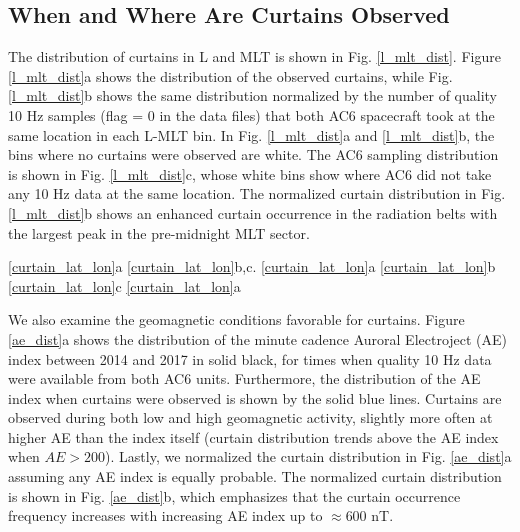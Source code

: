 \documentclass[draft]{agujournal2019}
\begin{document}
\subsection{When and Where Are Curtains Observed}
The distribution of curtains in L and MLT is shown in Fig. \ref{l_mlt_dist}. Figure \ref{l_mlt_dist}a shows the distribution of the observed curtains, while Fig. \ref{l_mlt_dist}b shows the same distribution normalized by the number of quality 10 Hz samples (flag = 0 in the data files) that both AC6 spacecraft took at the same location in each L-MLT bin. In Fig. \ref{l_mlt_dist}a and \ref{l_mlt_dist}b, the bins where no curtains were observed are white. The AC6 sampling distribution is shown in Fig. \ref{l_mlt_dist}c, whose white bins show where AC6 did not take any 10 Hz data at the same location. The normalized curtain distribution in Fig. \ref{l_mlt_dist}b shows an enhanced curtain occurrence in the radiation belts  with the largest peak in the pre-midnight MLT sector. 

 \ref{curtain_lat_lon}a  \ref{curtain_lat_lon}b,c.  \ref{curtain_lat_lon}a  \ref{curtain_lat_lon}b  \ref{curtain_lat_lon}c  \ref{curtain_lat_lon}a 

We also examine the geomagnetic conditions favorable for curtains. Figure \ref{ae_dist}a shows the distribution of the minute cadence Auroral Electroject (AE) index between 2014 and 2017 in solid black, for times when quality 10 Hz data were available from both AC6 units. Furthermore, the distribution of the AE index when curtains were observed is shown by the solid blue lines. Curtains are observed during both low and high geomagnetic activity, slightly more often at higher AE than the index itself (curtain distribution trends above the AE index when $AE > 200$). Lastly, we normalized the curtain distribution in Fig. \ref{ae_dist}a assuming any AE index is equally probable. The normalized curtain distribution is shown in Fig. \ref{ae_dist}b, which emphasizes that the curtain occurrence frequency increases with increasing AE index up to $\approx 600$ nT.
\end{document}

